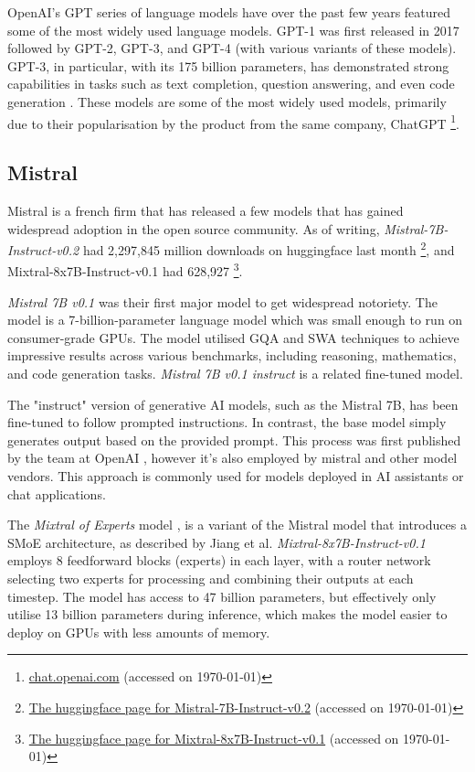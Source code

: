 OpenAI's \gls{GPT} series of language models have over the past few years featured some of the most widely used language models. GPT-1 was first released in 2017 followed by GPT-2, GPT-3, and GPT-4 (with various variants of these models). GPT-3, in particular, with its 175 billion parameters, has demonstrated strong capabilities in tasks such as text completion, question answering, and even code generation \cite{brown_language_2020-2}. These models are some of the most widely used models, primarily due to their popularisation by the product from the same company, ChatGPT \footnote{\href{https://chat.openai.com}{chat.openai.com} (accessed on \today)}.


\subsection{Mistral}
\label{sec:mistral_models}


Mistral is a french firm that has released a few models that has gained widespread adoption in the open source community. As of writing, \textit{Mistral-7B-Instruct-v0.2} had 2,297,845 million downloads on huggingface last month \footnote{\href{https://huggingface.co/mistralai/Mistral-7B-Instruct-v0.2}{The huggingface page for Mistral-7B-Instruct-v0.2} (accessed on \today)}, and Mixtral-8x7B-Instruct-v0.1 had 628,927 \footnote{\href{https://huggingface.co/mistralai/Mixtral-8x7B-Instruct-v0.1}{The huggingface page for Mixtral-8x7B-Instruct-v0.1} (accessed on \today)}.


\textit{Mistral 7B v0.1} \cite{jiang_mistral_2023} was their first major model to get widespread notoriety. The model is a 7-billion-parameter language model which was small enough to run on consumer-grade GPUs. The model utilised \gls{GQA}\cite{ainslie_gqa_2023-1} and \gls{SWA} \cite{roy_efficient_2021} techniques to achieve impressive results across various benchmarks, including reasoning, mathematics, and code generation tasks. \textit{Mistral 7B v0.1 instruct} is a related fine-tuned model.


The "instruct" version of generative AI models, such as the Mistral 7B, has been fine-tuned to follow prompted instructions. In contrast, the base model simply generates output based on the provided prompt. This process was first published by the team at OpenAI \cite{ouyang_training_2022-3}, however it’s also employed by mistral and other model vendors. This approach is commonly used for models deployed in AI assistants or chat applications.


The \textit{Mixtral of Experts} model \cite{jiang_mixtral_2024}, is a variant of the Mistral model that introduces a \gls{SMoE} architecture, as described by Jiang et al. \textit{Mixtral-8x7B-Instruct-v0.1} employs 8 feedforward blocks (experts) in each layer, with a router network selecting two experts for processing and combining their outputs at each timestep. The model has access to 47 billion parameters, but effectively only utilise 13 billion parameters during inference, which makes the model easier to deploy on GPUs with less amounts of memory.


